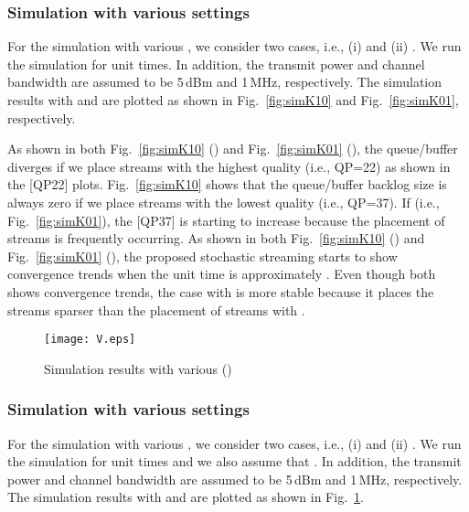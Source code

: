 \documentclass[conference]{IEEEtran}
\begin{document}
\begin{figure*}[t!]
	\centering
	\caption{Simulation results with various  ()}
	\label{fig:simK}
\end{figure*}

\subsubsection{Simulation with various  settings}\label{sec:3-3-1}

For the simulation with various , we consider two cases, i.e., (i)  and (ii) .
We run the simulation for  unit times.
In addition, the transmit power and channel bandwidth are assumed to be 5\,dBm and 1\,MHz, respectively.
The simulation results with  and  are plotted as shown in Fig.~\ref{fig:simK10} and Fig.~\ref{fig:simK01}, respectively.

As shown in both Fig.~\ref{fig:simK10} () and Fig.~\ref{fig:simK01} (),
    the queue/buffer diverges if we place streams with the highest quality (i.e., QP=22) as shown in the \textsf{[QP22]} plots.
Fig.~\ref{fig:simK10} shows that the queue/buffer backlog size is always zero if we place streams with the lowest quality (i.e., QP=37).
If  (i.e., Fig.~\ref{fig:simK01}), the \textsf{[QP37]} is starting to increase because the placement of streams is frequently occurring.
As shown in both Fig.~\ref{fig:simK10} () and Fig.~\ref{fig:simK01} (),
    the proposed stochastic streaming starts to show convergence trends when the unit time is approximately .
Even though both shows convergence trends, the case with  is more stable because it places the streams sparser than the placement of streams with .

\begin{figure}[t!]
	\begin{center}
		\texttt{[image: V.eps]}
	\end{center}
	\caption{Simulation results with various  ()}
	\label{fig:simV}
\end{figure}

\subsubsection{Simulation with various  settings}\label{sec:3-3-2}

For the simulation with various , we consider two cases, i.e., (i)  and (ii) .
We run the simulation for  unit times and we also assume that .
In addition, the transmit power and channel bandwidth are assumed to be 5\,dBm and 1\,MHz, respectively.
The simulation results with  and  are plotted as shown in Fig.~\ref{fig:simV}.
\end{document}
